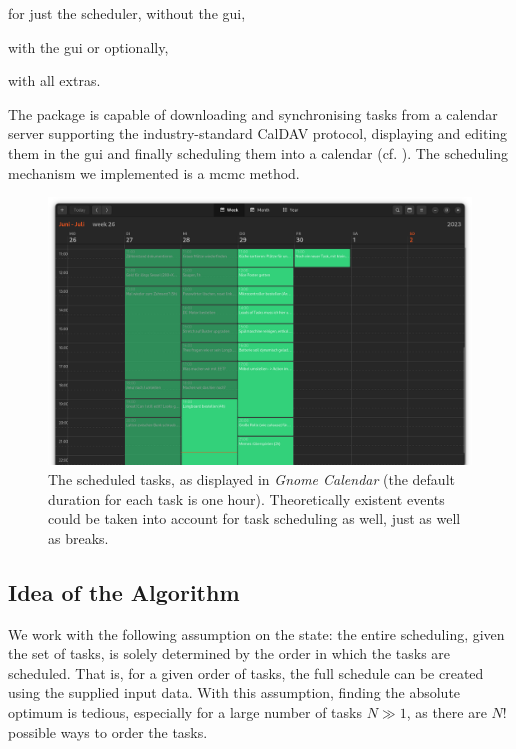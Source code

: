 \documentclass{prettytex/ox/mmsc-special-topic}
\begin{document}
  for just the scheduler, without the \gls{gui},

   with the \gls{gui} or optionally,

   with all extras.

  The package is capable of downloading and synchronising tasks from a calendar server supporting the industry-standard CalDAV protocol, displaying and editing them in the \gls{gui} and finally scheduling them into a calendar (cf. ).
  The scheduling mechanism we implemented is a \gls{mcmc} method.

  \begin{figure}[H]
    \centering
    \includegraphics[width=\linewidth]{figures/exported-calendar.png}
    \caption{The scheduled tasks, as displayed in \textit{Gnome Calendar} (the default duration for each task is one hour). Theoretically existent events could be taken into account for task scheduling as well, just as well as breaks.}
    \label{fig:calendar}
  \end{figure}

  \subsection{Idea of the Algorithm}
  We work with the following assumption on the state: the entire scheduling, given the set of tasks, is solely determined by the order in which the tasks are scheduled.
  That is, for a given order of tasks, the full schedule can be created using the supplied input data.
  With this assumption, finding the absolute optimum is tedious, especially for a large number of tasks $N \gg 1$, as there are $N!$ possible ways to order the tasks.
\end{document}
